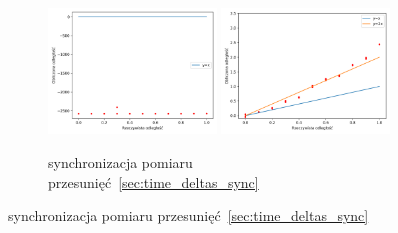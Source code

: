 \begin{figure}[H]
    \ContinuedFloat\centering
    \begin{subfigure}{\textwidth}
        \centering
        \includegraphics[width=0.49\textwidth]{pics/time_deltas_dist/dists.png}
        \includegraphics[width=0.49\textwidth]{pics/time_deltas_dist/dists_close.png}
        \caption{synchronizacja pomiaru przesunięć~\ref{sec:time_deltas_sync}}
        \label{pic:time_deltas_dist}
    \end{subfigure}
\end{figure}
